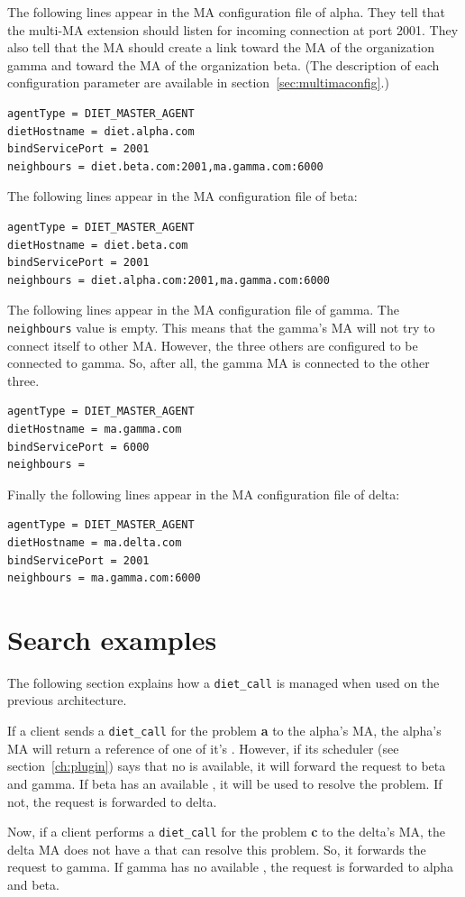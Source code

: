 The following lines appear in the MA configuration file of alpha. They
tell that the multi-MA extension should listen for incoming connection
at port 2001. They also tell that the MA should create a link toward
the MA of the organization gamma and toward the MA of the organization
beta. (The description of each configuration parameter are available
in section~\ref{sec:multimaconfig}.)

\begin{verbatim}
agentType = DIET_MASTER_AGENT
dietHostname = diet.alpha.com
bindServicePort = 2001
neighbours = diet.beta.com:2001,ma.gamma.com:6000
\end{verbatim}

The following lines appear in the MA configuration file of beta:

\begin{verbatim}
agentType = DIET_MASTER_AGENT
dietHostname = diet.beta.com
bindServicePort = 2001
neighbours = diet.alpha.com:2001,ma.gamma.com:6000
\end{verbatim}

The following lines appear in the MA configuration file of gamma. The
\texttt{neighbours} value is empty. This means that the gamma's MA
will not try to connect itself to other MA. However, the three others
are configured to be connected to gamma. So, after all, the gamma MA
is connected to the other three.

\begin{verbatim}
agentType = DIET_MASTER_AGENT
dietHostname = ma.gamma.com
bindServicePort = 6000
neighbours = 
\end{verbatim}

Finally the following lines appear in the MA configuration file of delta:

\begin{verbatim}
agentType = DIET_MASTER_AGENT
dietHostname = ma.delta.com
bindServicePort = 2001
neighbours = ma.gamma.com:6000
\end{verbatim}

\section{Search examples}

The following section explains how a \texttt{diet\_call} is managed
when used on the previous architecture.

If a client sends a \texttt{diet\_call} for the problem \textbf{a} to
the alpha's MA, the alpha's MA will return a reference of one of it's
\sed. However, if its scheduler (see section~\ref{ch:plugin}) says
that no \sed is available, it will forward the request to beta and
gamma. If beta has an available \sed, it will be used to resolve the
problem. If not, the request is forwarded to delta.

Now, if a client performs a \texttt{diet\_call} for the problem
\textbf{c} to the delta's MA, the delta MA does not have a \sed that
can resolve this problem. So, it forwards the request to gamma. If
gamma has no available \sed, the request is forwarded to alpha and
beta.
